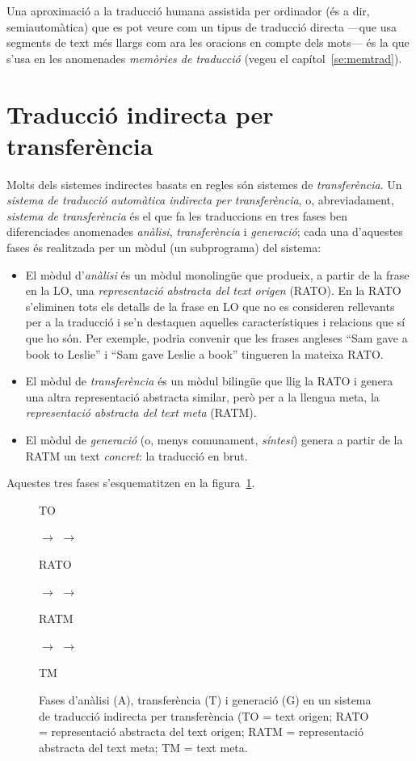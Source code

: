 Una aproximació a la traducció humana assistida per ordinador (és a
dir, semiautomàtica) que es pot veure com un tipus de traducció
directa ---que usa segments de text més llargs com ara les oracions en
compte dels mots--- és la que s'usa en les anomenades \emph{memòries
  de traducció} (vegeu el capítol~\ref{se:memtrad}).

  

\section{Traducció  indirecta per transferència}

\label{ss:classtrans}
Molts dels sistemes indirectes basats en regles són sistemes de
\emph{transferència}. Un \emph{sistema de traducció automàtica
  indirecta per transferència}, o, abreviadament, \emph{sistema de
  transferència} és el que fa les traduccions en tres fases ben
diferenciades anomenades \emph{anàlisi}, \emph{transferència} i
\emph{generació}; cada una d'aquestes fases és realitzada per un mòdul
(un subprograma) del sistema:
\begin{itemize}
\item El mòdul d'\emph{anàlisi} és un mòdul monolingüe que produeix, a
  partir de la frase en la LO, una \emph{representació abstracta del text
  origen} (RATO). En la RATO s'eliminen tots els detalls de la frase
  en LO que no es consideren rellevants per a la traducció i se'n destaquen
  aquelles característiques i relacions que sí que ho són.  Per
  exemple, podria convenir que les frases angleses ``Sam gave a book
  to Leslie'' i ``Sam gave Leslie a book'' \citep{arnold93j} tingueren
  la mateixa RATO.
\item El mòdul de \emph{transferència} és un mòdul bilingüe que llig
  la RATO i genera una altra representació abstracta similar, però per
  a la llengua meta, la \emph{representació abstracta del text meta}
  (RATM).
\item El mòdul de \emph{generació} (o, menys comunament,
  \emph{síntesi}) genera a partir de la RATM un text \emph{concret}: la
  traducció en brut.
\end{itemize}
Aquestes tres fases s'esquematitzen en la
figura~\ref{fg:transfer}. 


\begin{figure}
\begin{center}
\parbox{0.5cm}{TO} $\to$
 $\to$ 
\parbox{1.0cm}{RATO} $\to$
 $\to$
\parbox{1.25cm}{RATM} $\to$
 $\to$
\parbox{0.5cm}{TM} 
\end{center}
\caption{Fases d'anàlisi (A), transferència (T) i generació (G) en un
sistema de traducció indirecta per transferència (TO = text origen; RATO = representació abstracta del text origen; RATM = representació abstracta del text meta; TM = text meta.}
\label{fg:transfer} 
\end{figure}

